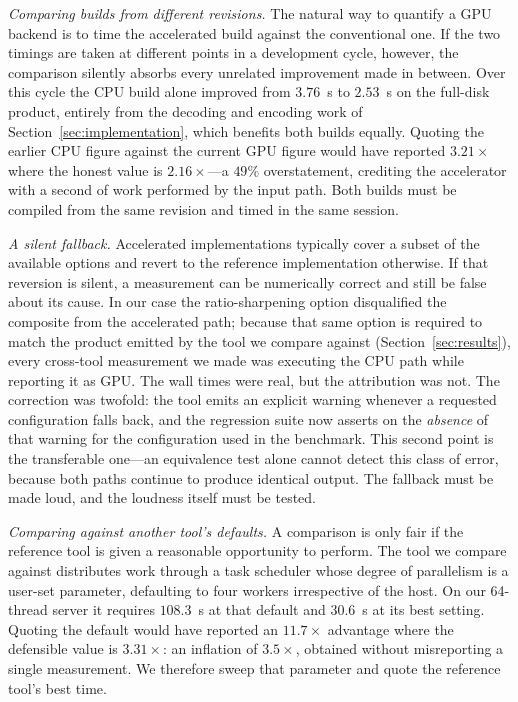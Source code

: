 \documentclass{ametsocV6.1}
\begin{document}
\textit{Comparing builds from different revisions.} The natural way to quantify
a GPU backend is to time the accelerated build against the conventional one.
If the two timings are taken at different points in a development cycle,
however, the comparison silently absorbs every unrelated improvement made in
between. Over this cycle the CPU build alone improved from $3.76$~s to
$2.53$~s on the full-disk product, entirely from the decoding and encoding work
of Section~\ref{sec:implementation}, which benefits both builds equally.
Quoting the earlier CPU figure against the current GPU figure would have
reported $3.21\times$ where the honest value is $2.16\times$---a $49\%$
overstatement, crediting the accelerator with a second of work performed by the
input path. Both builds must be compiled from the same revision and timed in
the same session.

\textit{A silent fallback.} Accelerated implementations typically cover a
subset of the available options and revert to the reference implementation
otherwise. If that reversion is silent, a measurement can be numerically
correct and still be false about its cause. In our case the ratio-sharpening
option disqualified the composite from the accelerated path; because that same
option is required to match the product emitted by the tool we compare against
(Section~\ref{sec:results}), every cross-tool measurement we made was executing
the CPU path while reporting it as GPU. The wall times were real, but the
attribution was not. The correction was twofold: the tool emits an explicit
warning whenever a requested configuration falls back, and the regression suite
now asserts on the \emph{absence} of that warning for the configuration used in
the benchmark. This second point is the transferable one---an equivalence test
alone cannot detect this class of error, because both paths continue to produce
identical output. The fallback must be made loud, and the loudness itself must
be tested.

\textit{Comparing against another tool's defaults.} A comparison is only fair
if the reference tool is given a reasonable opportunity to perform. The tool we
compare against distributes work through a task scheduler whose degree of
parallelism is a user-set parameter, defaulting to four workers irrespective of
the host. On our 64-thread server it requires $108.3$~s at that default and
$30.6$~s at its best setting. Quoting the default would have reported an
$11.7\times$ advantage where the defensible value is $3.31\times$: an inflation
of $3.5\times$, obtained without misreporting a single measurement. We
therefore sweep that parameter and quote the reference tool's best time.
\end{document}
